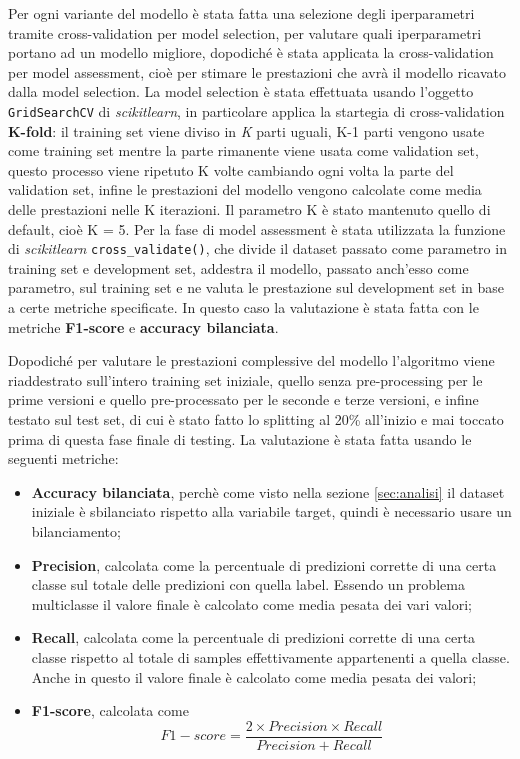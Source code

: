 Per ogni variante del modello è stata fatta una selezione degli iperparametri tramite cross-validation per model selection, per valutare quali iperparametri portano ad un modello migliore, dopodiché è stata applicata la cross-validation per model assessment, cioè per stimare le prestazioni che avrà il modello ricavato dalla model selection. La model selection è stata effettuata usando l'oggetto \verb+GridSearchCV+ di \textit{scikitlearn}, in particolare applica la startegia di cross-validation \textbf{K-fold}: il training set viene diviso in \textit{K} parti uguali, K-1 parti vengono usate come training set mentre la parte rimanente viene usata come validation set, questo processo viene ripetuto K volte cambiando ogni volta la parte del validation set, infine le prestazioni del modello vengono calcolate come media delle prestazioni nelle K iterazioni. Il parametro K è stato mantenuto quello di default, cioè K = 5. Per la fase di model assessment è stata utilizzata la funzione di \textit{scikitlearn} \verb+cross_validate()+, che divide il dataset passato come parametro in training set e development set, addestra il modello, passato anch'esso come parametro, sul training set e ne valuta le prestazione sul development set in base a certe metriche specificate. In questo caso la valutazione è stata fatta con le metriche \textbf{F1-score} e \textbf{accuracy bilanciata}.

Dopodiché per valutare le prestazioni complessive del modello l'algoritmo viene riaddestrato sull'intero training set iniziale, quello senza pre-processing per le prime versioni e quello pre-processato per le seconde e terze versioni, e infine testato sul test set, di cui è stato fatto lo splitting al 20\% all'inizio e mai toccato prima di questa fase finale di testing. La valutazione è stata fatta usando le seguenti metriche:
\begin{itemize}
\item \textbf{Accuracy bilanciata}, perchè come visto nella sezione \ref{sec:analisi} il dataset iniziale è sbilanciato rispetto alla variabile target, quindi è necessario usare un bilanciamento;
\item \textbf{Precision}, calcolata come la percentuale di predizioni corrette di una certa classe sul totale delle predizioni con quella label. Essendo un problema multiclasse il valore finale è calcolato come media pesata dei vari valori;
\item \textbf{Recall}, calcolata come la percentuale di predizioni corrette di una certa classe rispetto al totale di samples effettivamente appartenenti a quella classe. Anche in questo il valore finale è calcolato come media pesata dei valori;
\item \textbf{F1-score}, calcolata come
\begin{equation}
F1-score = \frac{2 \times Precision \times Recall}{Precision+Recall}
\end{equation}
\end{itemize}

